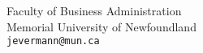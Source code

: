 \newcommand{\argmax}{\operatorname*{argmax}}
\newcommand{\argmin}{\operatorname*{argmin}}
\newcommand{\Ident}{\operatorname{I}}

\author %
{Joerg Evermann}

\institute%
{
  Faculty of Business Administration\\
  Memorial University of Newfoundland \\ 
  \texttt{jevermann@mun.ca} 
}

\date{}



